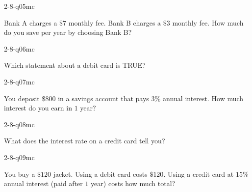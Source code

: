\begin{practiceQuestion}{2-8-q05}{mc}
\begin{questionText}
Bank A charges a $\$7$ monthly fee. Bank B charges a $\$3$ monthly fee. How much do you save per year by choosing Bank B?
\end{questionText}
\end{practiceQuestion}

\begin{practiceQuestion}{2-8-q06}{mc}
\begin{questionText}
Which statement about a debit card is TRUE?
\end{questionText}
\end{practiceQuestion}

\begin{practiceQuestion}{2-8-q07}{mc}
\begin{questionText}
You deposit $\$800$ in a savings account that pays $3\%$ annual interest. How much interest do you earn in $1$ year?
\end{questionText}
\end{practiceQuestion}

\begin{practiceQuestion}{2-8-q08}{mc}
\begin{questionText}
What does the interest rate on a credit card tell you?
\end{questionText}
\end{practiceQuestion}

\begin{practiceQuestion}{2-8-q09}{mc}
\begin{questionText}
You buy a $\$120$ jacket. Using a debit card costs $\$120$. Using a credit card at $15\%$ annual interest (paid after $1$ year) costs how much total?
\end{questionText}
\end{practiceQuestion}

